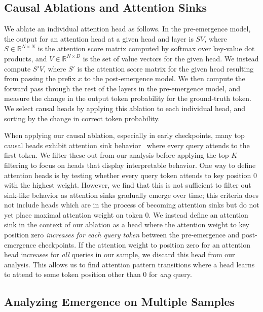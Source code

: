 \documentclass{article}
\begin{document}
\subsection{Causal Ablations and Attention Sinks}
We ablate an individual attention head as follows. In the pre-emergence model, the output for an attention head at a given head and layer is $SV$, where $S\in\mathbb{R}^{N\times N}$ is the attention score matrix computed by softmax over key-value dot products, and $V\in\mathbb{R}^{N\times D}$ is the set of value vectors for the given head. We instead compute $S'V$, where $S'$ is the attention score matrix for the given head resulting from passing the prefix $x$ to the post-emergence model. We then compute the forward pass through the rest of the layers in the pre-emergence model, and measure the change in the output token probability for the ground-truth token. We select causal heads by applying this ablation to each individual head, and sorting by the change in correct token probability.

When applying our causal ablation, especially in early checkpoints, many top causal heads exhibit attention sink behavior~\citep{xiao2024efficientstreaminglanguagemodels} where every query attends to the first token. We filter these out from our analysis before applying the top-$K$ filtering to focus on heads that display interpretable behavior. One way to define attention heads is by testing whether every query token attends to key position 0 with the highest weight. However, we find that this is not sufficient to filter out sink-like behavior as attention sinks gradually emerge over time; this criteria does not include heads which are in the process of becoming attention sinks but do not yet place maximal attention weight on token 0. We instead define an attention sink in the context of our ablation as a head where the attention weight to key position zero \textit{increases for each query token} between the pre-emergence and post-emergence checkpoints. If the attention weight to position zero for an attention head increases for \textit{all} queries in our sample, we discard this head from our analysis. This allows us to find attention pattern transitions where a head learns to attend to some token position other than 0 for \textit{any} query.

\subsection{Analyzing Emergence on Multiple Samples}
\label{app:sample}
\end{document}

